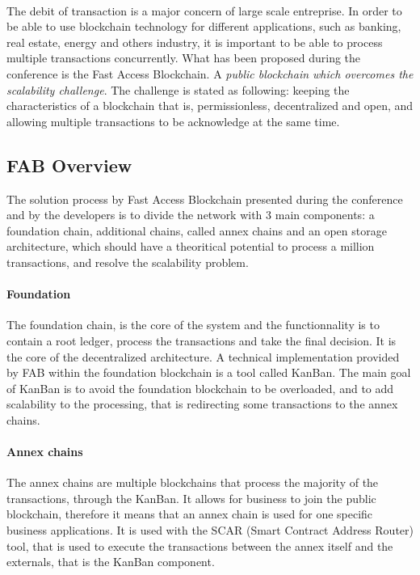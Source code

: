 \documentclass[11pt,a4paper]{article}
\begin{document}
\paragraph{}

The debit of transaction is a major concern of large scale
entreprise. In order to be able to use blockchain technology
for different applications, such as banking, real estate, energy
and others industry, it is important to be able
to process multiple transactions concurrently.
What has been proposed during the conference is the Fast Access Blockchain.
A \textit{public blockchain which overcomes the scalability challenge}.
The challenge is stated as following: keeping the characteristics
of a blockchain that is, permissionless, decentralized and open,
and allowing multiple transactions to be acknowledge at the same time.

\subsection{FAB Overview}

The solution process by Fast Access Blockchain presented during
the conference and by the developers
\cite{fabmedium} is to divide the network with 3 main components:
a foundation chain, additional chains, called annex chains and an
open storage architecture, which should have a theoritical potential
to process a million transactions, and resolve the scalability problem.

\paragraph{Foundation}

The foundation chain, is the core of the system and the functionnality
is to contain a root ledger, process the transactions and take
the final decision. It is the core of the decentralized architecture.
A technical implementation provided by FAB within the foundation blockchain
is a tool called KanBan. The main goal of KanBan is to avoid the foundation
blockchain to be overloaded, and to add scalability to the
processing, that is redirecting some transactions to the
annex chains.

\paragraph{Annex chains}

The annex chains are multiple blockchains that process the majority
of the transactions, through the KanBan. It allows for
business to join the public blockchain, therefore it means that
an annex chain is used for one specific business applications.
It is used with the SCAR (Smart Contract Address Router) tool, that is
used to execute the transactions between the annex itself
and the externals, that is the KanBan component.
\end{document}
